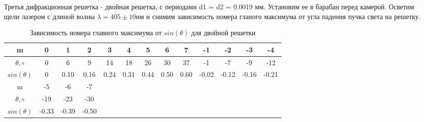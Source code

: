 \documentclass[a4paper, 12pt]{article}
\begin{document}
	Третья дифракционная решетка - двойная решетка, с периодами d1 = d2 = 0.0019 мм. 
	Установим ее в барабан перед камерой. Осветим щели лазером с длиной волны 
	$\lambda = 405 \pm 10 \text{нм}$ и снимим зависимость номера гланого максимума от 
	угла падения пучка света на решетку. 

	\begin{table}[!ht]
		\centering
		\caption{Зависимость номера главного максимума от $sin(\theta)$ для двойной решетки}
		\begin{tabular}{|c|c|c|c|c|c|c|c|c|c|c|c|c|}
		\hline
			m & 0 & 1 & 2 & 3 & 4 & 5 & 6 & 7 & -1 & -2 & -3 & -4 \\ \hline
			$\theta, \circ$ & 0 & 6 & 9 & 14 & 18 & 26 & 30 & 37 & -1 & -7 & -9 & -12  \\ \hline
			$sin(\theta)$ & 0 & 0.10 & 0.16 & 0.24 & 0.31 & 0.44 & 0.50 & 0.60 & -0.02 & -0.12 & -0.16 & -0.21 \\ \hline
			m  & -5 & -6 & -7 & ~ &  ~ &  ~ &  ~&  ~ & ~ &  ~&  ~ &  ~ \\ \hline
			$\theta, \circ$ & -19 & -23 & -30 & ~& ~ &  ~ &  ~ &  ~&  ~ & ~ &  ~&  ~ \\ \hline
			$sin(\theta)$  & -0.33 & -0.39 & -0.50 & ~& ~ &  ~ &  ~ &  ~&  ~ & ~ &  ~&  ~ \\ \hline
		\end{tabular}
		\label{tab: tab3}
	\end{table}

	\FloatBarrier
\end{document}
